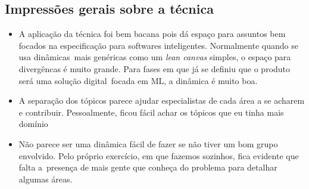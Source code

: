 \documentclass[10pt, a4paper]{article}
\begin{document}
\subsection{Impressões gerais sobre a técnica}

\begin{itemize}
    \item A aplicação da técnica foi bem bacana pois dá espaço para assuntos bem focados na especificação para softwares inteligentes. Normalmente quando se usa dinâmicas\
    mais genéricas como um \textit{lean canvas} simples, o espaço para divergêncas é muito grande. Para fases em que já se definiu que o produto será uma solução digital\
    focada em ML, a dinâmica é muito boa.
    \item A separação dos tópicos parece ajudar especialistas de cada área a se acharem e contribuir. Pessoalmente, ficou fácil achar os tópicos que eu tinha mais domínio
    \item Não parece ser uma dinâmica fácil de fazer se não tiver um bom grupo envolvido. Pelo próprio exercício, em que fazemos sozinhos, fica evidente que falta a\
    presença de mais gente que conheça do problema para detalhar algumas áreas.
\end{itemize}









\end{document}
